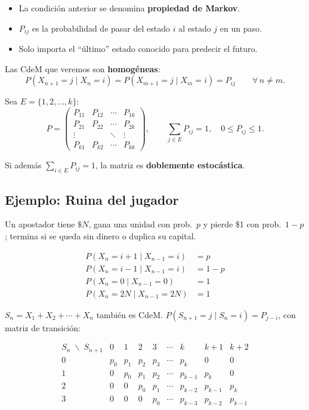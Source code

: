 \begin{nota}
\begin{itemize}
    \item La condición anterior se denomina \textbf{propiedad de Markov}.
    \item $P_{ij}$ es la probabilidad de pasar del estado $i$ al estado $j$ en un paso.
    \item Solo importa el ``último'' estado conocido para predecir el futuro.
\end{itemize}
\end{nota}

Las CdeM que veremos son \textbf{homogéneas}:
\[
P(X_{n+1}=j\mid X_n=i)=P(X_{m+1}=j\mid X_m=i)=P_{ij}\qquad\forall\,n\neq m.
\]

Sea $E=\{1,2,\dots,k\}$:
\[
P=\begin{pmatrix}
P_{11}&P_{12}&\cdots&P_{1k}\\
P_{21}&P_{22}&\cdots&P_{2k}\\
\vdots& &\ddots&\vdots\\
P_{k1}&P_{k2}&\cdots&P_{kk}
\end{pmatrix},\qquad
\sum_{j\in E}P_{ij}=1,\quad 0\leq P_{ij}\leq 1.
\]

Si además $\sum_{i\in E}P_{ij}=1$, la matriz es \textbf{doblemente estocástica}.

\subsection{Ejemplo: Ruina del jugador}

Un apostador tiene $\$N$, gana una unidad con prob.\ $p$ y pierde \$1 con prob.\ $1{-}p$; termina si se queda sin dinero o duplica su capital.


\begin{align*}
    P(X_n=i+1\mid X_{n-1}=i)&=p\\
    P(X_n=i-1\mid X_{n-1}=i)&=1-p\\
    P(X_n=0\mid X_{n-1}=0)&=1\\
    P(X_n=2N\mid X_{n-1}=2N)&=1
\end{align*}

$S_n=X_1+X_2+\cdots+X_n$ también es CdeM. $P(S_{n+1}=j\mid S_n=i)=P_{j-i}$, con matriz de transición:

\[
\begin{array}{c|cccccccc}
S_n\;\backslash\; S_{n+1} & 0 & 1 & 2 & 3 & \cdots & k & k{+}1 & k{+}2\\\hline
0 & p_0&p_1&p_2&p_3&\cdots&p_k&0&0\\
1 & 0&p_0&p_1&p_2&\cdots&p_{k-1}&p_k&0\\
2 & 0&0&p_0&p_1&\cdots&p_{k-2}&p_{k-1}&p_k\\
3 & 0&0&0&p_0&\cdots&p_{k-3}&p_{k-2}&p_{k-1}\\
\end{array}
\]

